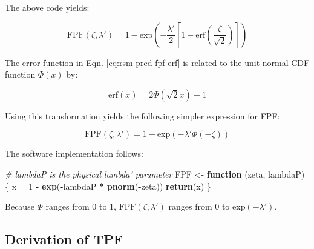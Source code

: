 \documentclass[
]{book}
\newenvironment{Shaded}{\begin{snugshade}}{\end{snugshade}}
\newcommand{\CommentTok}[1]{\textcolor[rgb]{0.56,0.35,0.01}{\textit{#1}}}
\newcommand{\ControlFlowTok}[1]{\textcolor[rgb]{0.13,0.29,0.53}{\textbf{#1}}}
\newcommand{\DecValTok}[1]{\textcolor[rgb]{0.00,0.00,0.81}{#1}}
\newcommand{\KeywordTok}[1]{\textcolor[rgb]{0.13,0.29,0.53}{\textbf{#1}}}
\newcommand{\NormalTok}[1]{#1}
\newcommand{\OperatorTok}[1]{\textcolor[rgb]{0.81,0.36,0.00}{\textbf{#1}}}
\newcommand{\StringTok}[1]{\textcolor[rgb]{0.31,0.60,0.02}{#1}}
\begin{document}
The above code yields:

\begin{equation}
\text{FPF}\left (\zeta , \lambda'\right ) = 1 - \text{exp}\left ( -\frac{\lambda'}{2} \left [ 1-\text{erf}\left ( \frac{\zeta}{\sqrt{2}} \right ) \right ]  \right ) 
\label{eq:rsm-pred-fpf-erf}
\end{equation}

The error function in Eqn. \eqref{eq:rsm-pred-fpf-erf} is related to the unit normal CDF function \(\Phi(x)\) by:

\begin{equation}
\text{erf} \left (x \right ) =  2\Phi \left ( \sqrt{2} x\right ) - 1
\label{eq:rsm-pred-erf-phi-relation}
\end{equation}

Using this transformation yields the following simpler expression for FPF:

\begin{equation}
\text{FPF}\left (\zeta , \lambda'\right ) = 1 - \text{exp}\left ( -\lambda' \Phi\left ( -\zeta \right )  \right )
\label{eq:rsm-pred-fpf}
\end{equation}

The software implementation follows:

\begin{Shaded}
\begin{Highlighting}[]
\CommentTok{# lambdaP is the physical lambda' parameter}
\NormalTok{FPF <-}\StringTok{ }\ControlFlowTok{function}\NormalTok{ (zeta, lambdaP) \{}
\NormalTok{  x =}\StringTok{ }\DecValTok{1} \OperatorTok{-}\StringTok{ }\KeywordTok{exp}\NormalTok{(}\OperatorTok{-}\NormalTok{lambdaP }\OperatorTok{*}\StringTok{ }\KeywordTok{pnorm}\NormalTok{(}\OperatorTok{-}\NormalTok{zeta))}
  \KeywordTok{return}\NormalTok{(x)}
\NormalTok{\}}
\end{Highlighting}
\end{Shaded}

Because \(\Phi\) ranges from 0 to 1, \(\text{FPF}\left (\zeta , \lambda'\right )\) ranges from 0 to \(\text{exp} \left ( -\lambda' \right )\).

\hypertarget{rsm-pred-roc-curve-tpf}{%
\subsection{Derivation of TPF}\label{rsm-pred-roc-curve-tpf}}
\end{document}
